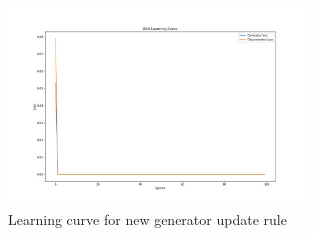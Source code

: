 \documentclass[a4paper]{article}
\theoremstyle{definition}
\newenvironment{soln}{
	\leavevmode\color{blue}\ignorespaces
}{}
\begin{document}
\begin{enumerate} [label=(\alph*)]
		\begin{soln} 
		
			\begin{figure}[H]
				\centering
				\includegraphics[width=0.7\textwidth]{../outputs/loss.jpg}
				\caption{Learning curve for new generator update rule}
				\label{fig:gan_q1_loss_submission}
			\end{figure}
			

\end{soln}
\end{enumerate}
\end{document}
